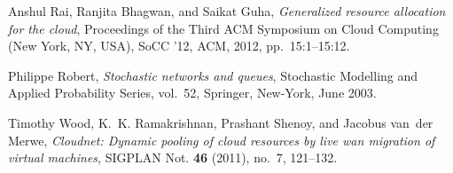 \documentclass{amsart}
\begin{document}
\begin{thebibliography}{10}
Anshul Rai, Ranjita Bhagwan, and Saikat Guha, \emph{Generalized resource
  allocation for the cloud}, Proceedings of the Third ACM Symposium on Cloud
  Computing (New York, NY, USA), SoCC '12, ACM, 2012, pp.~15:1--15:12.

Philippe Robert, \emph{Stochastic networks and queues}, Stochastic Modelling
  and Applied Probability Series, vol.~52, Springer, New-York, June 2003.

Timothy Wood, K.~K. Ramakrishnan, Prashant Shenoy, and Jacobus van~der Merwe,
  \emph{Cloudnet: Dynamic pooling of cloud resources by live wan migration of
  virtual machines}, SIGPLAN Not. \textbf{46} (2011), no.~7, 121--132.

\end{thebibliography}
\end{document}
